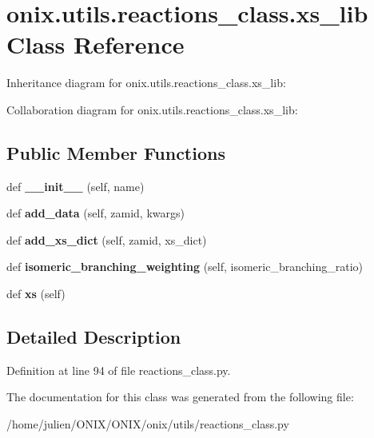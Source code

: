 \hypertarget{classonix_1_1utils_1_1reactions__class_1_1xs__lib}{}\section{onix.\+utils.\+reactions\+\_\+class.\+xs\+\_\+lib Class Reference}
\label{classonix_1_1utils_1_1reactions__class_1_1xs__lib}


Inheritance diagram for onix.\+utils.\+reactions\+\_\+class.\+xs\+\_\+lib\+:


Collaboration diagram for onix.\+utils.\+reactions\+\_\+class.\+xs\+\_\+lib\+:
\subsection*{Public Member Functions}
\begin{DoxyCompactItemize}
\item 
\mbox{\label{classonix_1_1utils_1_1reactions__class_1_1xs__lib_a68947ec72eb5e04668cb224af2d0a8d0}} 
def {\bfseries \+\_\+\+\_\+init\+\_\+\+\_\+} (self, name)
\item 
\mbox{\label{classonix_1_1utils_1_1reactions__class_1_1xs__lib_a6392a2464d10785e892afed580112947}} 
def {\bfseries add\+\_\+data} (self, zamid, kwargs)
\item 
\mbox{\label{classonix_1_1utils_1_1reactions__class_1_1xs__lib_a48d89d51fa6ff496db73d557693a6f37}} 
def {\bfseries add\+\_\+xs\+\_\+dict} (self, zamid, xs\+\_\+dict)
\item 
\mbox{\label{classonix_1_1utils_1_1reactions__class_1_1xs__lib_a964e06d6893331797c62126be83b5f6f}} 
def {\bfseries isomeric\+\_\+branching\+\_\+weighting} (self, isomeric\+\_\+branching\+\_\+ratio)
\item 
\mbox{\label{classonix_1_1utils_1_1reactions__class_1_1xs__lib_a648fcbf8c964d9f3b8a81292725b38ed}} 
def {\bfseries xs} (self)
\end{DoxyCompactItemize}


\subsection{Detailed Description}


Definition at line 94 of file reactions\+\_\+class.\+py.



The documentation for this class was generated from the following file\+:\begin{DoxyCompactItemize}
\item 
/home/julien/\+O\+N\+I\+X/\+O\+N\+I\+X/onix/utils/reactions\+\_\+class.\+py\end{DoxyCompactItemize}
